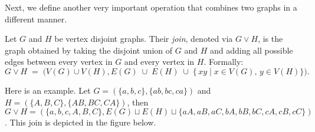 Next, we define another very important operation that combines two graphs in a different manner.

\begin{definition}[Join]
    Let $G$ and $H$ be vertex disjoint graphs. Their
    \textit{join}, denoted via $G \vee H$, is the graph obtained by
    taking the disjoint union of $G$ and $H$ and adding all
    possible edges between every vertex in $G$ and every vertex
    in $H$. Formally:
    $$
      G \vee H
      \;=\;
      \bigl(
        V(G)\cup V(H),
        E(G)\;\cup\;E(H)\;\cup\;\{\,xy \mid x\in V(G),\, y\in V(H)\}
      \bigr).
    $$
  \end{definition}
Here is an example. Let $G=(\{a,b,c\},\{ab,bc,ca\})$ and $H=(\{A,B,C\},\{AB,BC,CA\})$, then $G\lor H=(\{a,b,c,A,B,C\},E(G)\sqcup E(H)\sqcup\{aA,aB,aC,bA,bB,bC,cA,cB,cC\})$. This join is depicted in the figure below.

